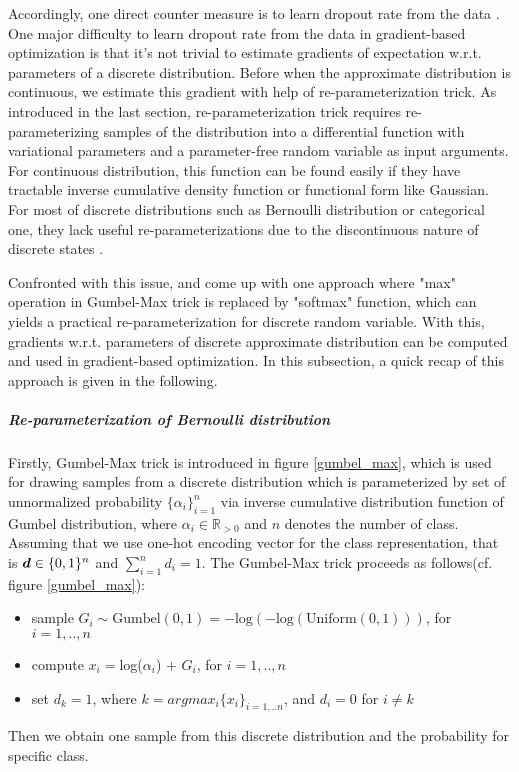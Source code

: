 Accordingly, one direct counter measure is to learn dropout rate from the data \cite{gal2017concrete}. One major difficulty to learn dropout rate from the data in gradient-based optimization is that it's not trivial to estimate gradients of expectation w.r.t. parameters of a discrete distribution. Before when the approximate distribution is continuous, we estimate this gradient with help of re-parameterization trick. As introduced in the last section, re-parameterization trick requires re-parameterizing samples of the distribution into a differential function with variational parameters and a parameter-free random variable as input arguments. For continuous distribution, this function can be found easily if they have tractable inverse cumulative density function or functional form like Gaussian\cite{kingma2013auto}. For most of discrete distributions such as Bernoulli distribution or categorical one, they lack useful re-parameterizations
due to the discontinuous nature of discrete states \cite{maddison2016concrete}. 

Confronted with this issue, \cite{jang2016categorical} and \cite{maddison2016concrete} come up with one approach where "max" operation in Gumbel-Max trick is replaced by "softmax" function, which can yields a practical re-parameterization for discrete random variable. With this, gradients w.r.t. parameters of discrete approximate distribution can be computed and used in gradient-based optimization. In this subsection, a quick recap of this approach is given in the following.

\subparagraph{Re-parameterization of Bernoulli distribution}
Firstly, Gumbel-Max trick\cite{maddison2014sampling} is introduced in figure \ref{gumbel_max}, which is used for drawing samples from a discrete distribution which is parameterized by set of unnormalized probability $\{\alpha_i\}_{i=1}^{n}$ via inverse cumulative distribution function of Gumbel distribution, where $\alpha_i \in \mathbb R_{>0}$ and $n$ denotes the number of class. Assuming that we use one-hot encoding vector for the class representation, that is $\boldsymbol d \in \{0,1\}^n $ and $\sum_{i=1}^{n}d_i = 1$. The Gumbel-Max trick proceeds as follows(cf. figure \ref{gumbel_max}):
\begin{itemize}
	\item sample $G_i \sim \text{Gumbel}(0,1) = -\text{log}(-\text{log}(\text{Uniform}(0,1)))$, for $i=1,..,n$
	\item compute $x_i = $log($\alpha_i$) + $G_i$, for $i=1,..,n$
	\item set $d_k = 1$, where $k=argmax_i\{x_i\}_{i=1,..n}$, and $d_i = 0$ for $i \neq k$
\end{itemize}
Then we obtain one sample from this discrete distribution and the probability for specific class.

